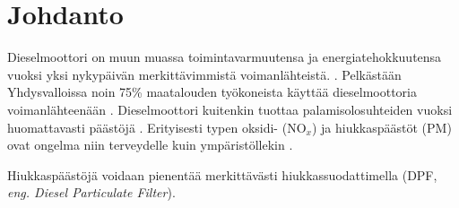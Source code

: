 \chapter{Johdanto}%
\label{ch:johdanto}
Dieselmoottori on muun muassa toimintavarmuutensa ja energiatehokkuutensa vuoksi yksi nykypäivän merkittävimmistä voimanlähteistä.  
\cite[s. 121, 137-138]{Koten_2024}.
Pelkästään Yhdysvalloissa noin 75\% maatalouden työkoneista käyttää dieselmoottoria voimanlähteenään 
\cite[s. 122]{Koten_2024}.  
Dieselmoottori kuitenkin tuottaa palamisolosuhteiden vuoksi
huomattavasti päästöjä \cite{FiebigMichael2014Pefd}. Erityisesti typen oksidi- (NO\(_x\)) ja hiukkaspäästöt (PM) ovat ongelma niin terveydelle kuin ympäristöllekin \cite{FiebigMichael2014Pefd}\cite[s. 138]{Koten_2024}.

Hiukkaspäästöjä voidaan pienentää merkittävästi hiukkassuodattimella (DPF, \emph{eng. Diesel Particulate Filter}). 
 